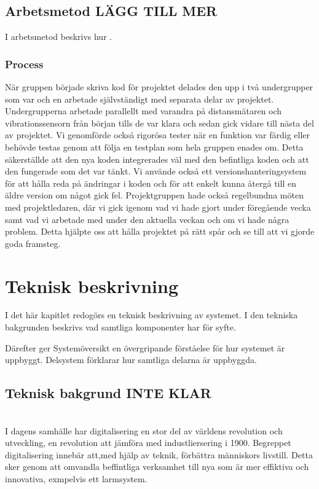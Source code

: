 \documentclass{article}
\begin{document}

\subsection{Arbetsmetod LÄGG TILL MER }
I arbetsmetod beskrivs hur .


\subsubsection{Process}
När gruppen började skriva kod för projektet delades den upp i två undergrupper som var och en arbetade självständigt med separata delar av projektet. 
Undergrupperna arbetade parallellt med varandra på distansmätaren och vibrationssensorn från början tills de var klara och sedan gick vidare till nästa del av projektet.
Vi genomförde också rigorösa tester när en funktion var färdig eller behövde testas genom att följa en testplan som hela gruppen enades om. 
Detta säkerställde att den nya koden integrerades väl med den befintliga koden och att den fungerade som det var tänkt.
Vi använde också ett versionshanteringsystem för att hålla reda på ändringar i koden och för att enkelt kunna återgå till en äldre version om något gick fel.
Projektgruppen hade också regelbundna möten med projektledaren,
där vi gick igenom vad vi hade gjort under föregående vecka samt vad vi arbetade med under den aktuella veckan och om vi hade några problem.
Detta hjälpte oss att hålla projektet på rätt spår och se till att vi gjorde goda framsteg.


\newpage
\section{Teknisk beskrivning}
I det här kapitlet redogörs en teknisk beskrivning av systemet. 
I den tekniska bakgrunden beskrivs vad samtliga komponenter har för syfte.

Därefter ger Systemöversikt en övergripande förståelse för hur systemet är uppbyggt. Delsystem förklarar hur samtliga delarna är uppbyggda.

\subsection{Teknisk bakgrund INTE KLAR }\\
I dagens samhälle har digitalisering en stor del av världens revolution och utveckling, en revolution att jämföra med industliersering i 1900. Begreppet digitalisering innebär att,med hjälp av teknik, förbättra människors livstill. Detta sker genom att omvandla beffintliga verksamhet till nya som är mer effiktiva och innovativa, exmpelvis ett larmsystem. 
\end{document}
